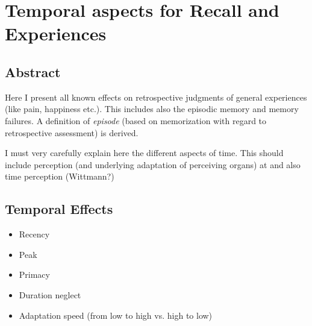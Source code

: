 \chapter{Temporal aspects for Recall and Experiences}\label{chap:03}
\section*{Abstract}
Here I present all known effects on retrospective judgments of general experiences (like pain, happiness etc.).
This includes also the episodic memory and memory failures.
A definition of \emph{episode} (based on memorization with regard to retrospective assessment) is derived.

I must very carefully explain here the different aspects of time.
This should include perception (and underlying adaptation of perceiving organs) at and also time perception (Wittmann?)

\section{Temporal Effects}
\begin{itemize}
\item Recency
\item Peak
\item Primacy
\item Duration neglect
\item Adaptation speed (from low to high vs. high to low)
\end{itemize}


